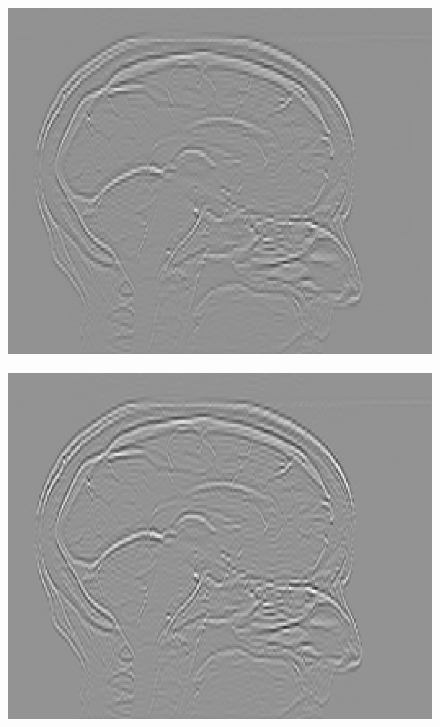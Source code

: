 \documentclass[fleqn,a4paper,oneside,openany]{book}
\begin{document}
\begin{figure}
\begin{minipage}[b]{150pt}
     \label{fig:radiomics_spline_1mm_high_pass}
     \hspace{100pt}
   \end{minipage}
   \begin{minipage}[b]{150pt}
     \centering
     \includegraphics[trim = 0 0 0 0, clip, scale=0.4]{radiomics_filtering/interpolation_image_hi_2mm_1_hi.png}
     \label{fig:radiomics_linear_2mm_high_pass}
     \hspace{100pt}
   \end{minipage}
   \begin{minipage}[b]{150pt}
     \centering
     \includegraphics[trim = 0 0 0 0, clip, scale=0.4]{radiomics_filtering/interpolation_image_hi_2mm_3_hi.png}

\end{minipage}
\end{figure}
\end{document}
